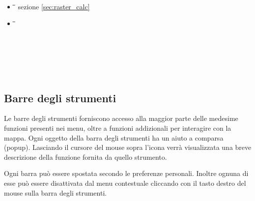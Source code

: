 \begin{itemize}
\item {}
\begin{tabbing}
\hspace{5cm}\=\hspace{3cm}\=\hspace{3.5cm}\= \kill
{}
        \>
        \> sezione \ref{sec:raster_calc}
        \>  \\
\end{tabbing}

\item {}
\begin{tabbing}
\hspace{5cm}\=\hspace{3cm}\=\hspace{3.5cm}\= \kill
{}
	\> 
	\>           	
	\> \\
        \>
        \> 
        \>  \\
	\> 
	\>          	
	\\
	\\
	\\
	\\
\end{tabbing}
\end{itemize}


\subsection{Barre degli strumenti}\label{label_toolbars}

Le barre degli strumenti forniscono accesso alla maggior parte delle medesime funzioni presenti nei menu,
oltre a funzioni addizionali per interagire con la mappa. Ogni oggetto della barra degli strumenti
ha un aiuto a comparsa (popup). Lasciando il cursore del mouse sopra l'icona verrà 
visualizzata una breve descrizione della funzione fornita da quello strumento.

Ogni barra può essere spostata secondo le preferenze personali. Inoltre ognuna di esse
può essere disattivata dal menu contestuale cliccando con il tasto destro del mouse
sulla barra degli strumenti.

